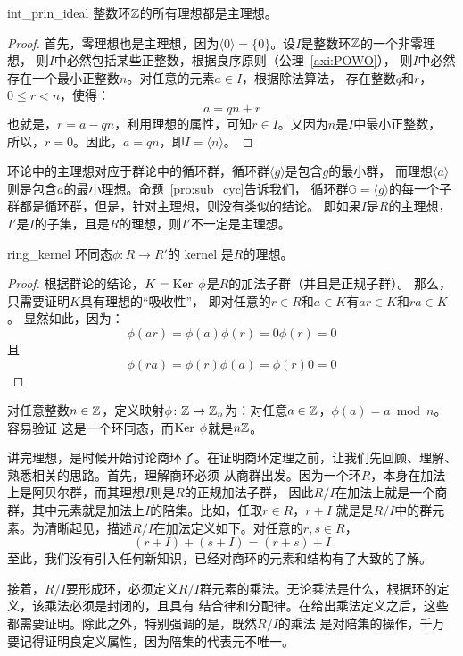 \begin{proposition}{}{int_prin_ideal}
整数环${\mathbb Z}$的所有理想都是主理想。
\end{proposition}

\begin{proof}
首先，零理想也是主理想，因为$\langle 0 \rangle = \{0\}$。设$I$是整数环${\mathbb Z}$的一个非零理想，
则$I$中必然包括某些正整数，根据良序原则（公理~\ref{axi:POWO}），
则$I$中必然存在一个最小正整数$n$。对任意的元素$a\in I$，根据除法算法，
存在整数$q$和$r$，$0 \leq r < n$，使得：
\[ a = qn + r\]
也就是，$r = a - qn$，利用理想的属性，可知$r \in I$。又因为$n$是$I$中最小正整数，
所以，$r=0$。因此，$a = qn$，即$I = \langle n \rangle $。
\end{proof}

环论中的主理想对应于群论中的循环群，循环群$\langle g \rangle $是包含$g$的最小群，
而理想$\langle a \rangle$则是包含$a$的最小理想。命题~\ref{pro:sub_cyc}告诉我们，
循环群$\mathbb{G}=\langle g \rangle$的每一个子群都是循环群，但是，针对主理想，则没有类似的结论。
即如果$I$是$R$的主理想，$I'$是$I$的子集，且是$R$的理想，则$I'$不一定是主理想。

\begin{proposition}{}{ring_kernel}
环同态$\phi\colon R \to R'$的 kernel 是$R$的理想。
\end{proposition}

\begin{proof}
根据群论的结论，$K = \operatorname{Ker}\;\phi$是$R$的加法子群（并且是正规子群）。
那么，只需要证明$K$具有理想的“吸收性”，
即对任意的$r \in R$和$a \in K$有$ar \in K$和$ra \in K$。
显然如此，因为：
\[\phi(ar) =  \phi(a) \phi(r) = 0 \phi(r) = 0 \]
且
\[\phi(ra) = \phi(r )\phi(a) = \phi(r) 0 = 0\]
\end{proof}

\begin{example}
对任意整数$n\in {\mathbb Z}$，定义映射$\phi\colon {\mathbb Z} \to {\mathbb Z}_n$为：对任意$a \in {\mathbb Z}$，$\phi(a) = a \bmod n$。容易验证
这是一个环同态，而$\operatorname{Ker}\;\phi$就是$n{\mathbb Z}$。
\end{example}
讲完理想，是时候开始讨论商环了。在证明商环定理之前，让我们先回顾、理解、熟悉相关的思路。首先，理解商环必须
从商群出发。因为一个环$R$，本身在加法上是阿贝尔群，而其理想$I$则是$R$的正规加法子群，
因此$R/I$在加法上就是一个商群，其中元素就是加法上$I$的陪集。比如，任取$r\in R$，$r + I$
就是是$R/I$中的群元素。为清晰起见，描述$R/I$在加法定义如下。对任意的$r, s \in R$，
\[(r + I) + (s + I) = (r+s) + I\]
至此，我们没有引入任何新知识，已经对商环的元素和结构有了大致的了解。

接着，$R/I$要形成环，必须定义$R/I$群元素的乘法。无论乘法是什么，根据环的定义，该乘法必须是封闭的，且具有
结合律和分配律。在给出乘法定义之后，这些都需要证明。除此之外，特别强调的是，既然$R/I$的乘法
是对陪集的操作，千万要记得证明良定义属性，因为陪集的代表元不唯一。

